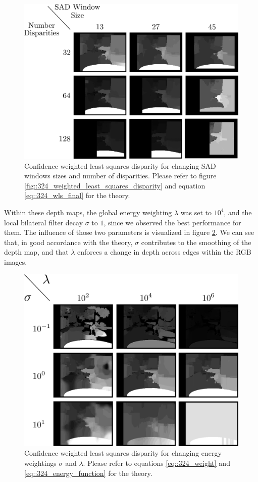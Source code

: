 \begin{figure}[h]
	\centering
	\includegraphics[scale=.25]{chapters/05_experiments/02_depth_map_parameter_tuning/disp_sad_wls.png}
	\caption{Confidence weighted least squares disparity for changing SAD windows sizes and number of disparities. Please refer to figure \ref{fig::324_weighted_least_squares_disparity} and equation \ref{eq::324_wls_final} for the theory.}
	\label{fig::52_disp_sad_wls}
\end{figure}
Within these depth maps, the global energy weighting $\lambda$ was set to $10^4$, and the local bilateral filter decay $\sigma$ to $1$, since we observed the best performance for them. The influence of those two parameters is visualized in figure \ref{fig::52_sigma_lambda}. We can see that, in good accordance with the theory, $\sigma$ contributes to the smoothing of the depth map, and that $\lambda$ enforces a change in depth across edges within the RGB images.
\begin{figure}[h]
	\centering
	\includegraphics[scale=.25]{chapters/05_experiments/02_depth_map_parameter_tuning/sigma_lambda.png}
	\caption{Confidence weighted least squares disparity for changing energy weightings $\sigma$ and $\lambda$. Please refer to equations \ref{eq::324_weight} and \ref{eq::324_energy_function} for the theory.}
	\label{fig::52_sigma_lambda}
\end{figure}
